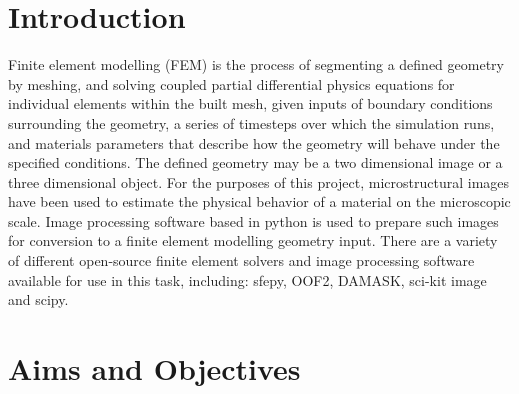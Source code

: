 \documentclass[\report.tex]{subfiles}
\begin{document}
\section{Introduction}
Finite element modelling (FEM) is the process of segmenting a defined geometry by meshing, and solving coupled partial differential physics equations for individual elements within the built mesh, given inputs of boundary conditions surrounding the geometry, a series of timesteps over which the simulation runs, and materials parameters that describe how the geometry will behave under the specified conditions. The defined geometry may be a two dimensional image or a three dimensional object. For the purposes of this project, microstructural images have been used to estimate the physical behavior of a material on the microscopic scale. Image processing software based in python is used to prepare such images for conversion to a finite element modelling geometry input. There are a variety of different open-source finite element solvers and image processing software available for use in this task, including: sfepy, OOF2, DAMASK, sci-kit image and scipy.

\section{Aims and Objectives}
\end{document}

